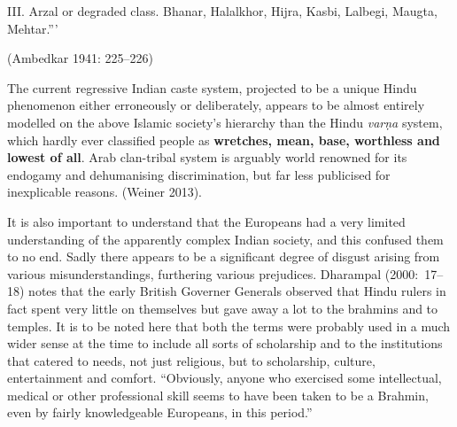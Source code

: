 III. Arzal or degraded class. Bhanar, Halalkhor, Hijra, Kasbi, Lalbegi, Maugta, Mehtar.”’

\vspace{-.3cm}

\begin{flushright}
(Ambedkar 1941: 225–226)
\end{flushright}

The current regressive Indian caste system, projected to be a unique Hindu phenomenon either erroneously or deliberately, appears to be almost entirely modelled on the above Islamic society's hierarchy than the Hindu \textit{varṇa} system, which hardly ever classified people as \textbf{wretches, mean, base, worthless and lowest of all}. Arab clan-tribal system is arguably world renowned for its endogamy and dehumanising discrimination, but far less publicised for inexplicable reasons. (Weiner 2013).

\newpage

It is also important to understand that the Europeans had a very limited understanding of the apparently complex Indian society, and this confused them to no end. Sadly there appears to be a significant degree of disgust arising from various misunderstandings, furthering various prejudices. Dharampal (2000:~17–18) notes that the early British Governer Generals observed that Hindu rulers in fact spent very little on themselves but gave away a lot to the brahmins and to temples. It is to be noted here that both the terms were probably used in a much wider sense at the time to include all sorts of scholarship and to the institutions that catered to needs, not just religious, but to scholarship, culture, entertainment and comfort. “Obviously, anyone who exercised some intellectual, medical or other professional skill seems to have been taken to be a Brahmin, even by fairly knowledgeable Europeans, in this period.”


